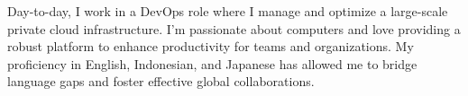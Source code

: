 

\begin{cvparagraph}

Day-to-day, I work in a DevOps role where I manage and optimize a large-scale private cloud infrastructure. I'm passionate about computers and love providing a robust platform to enhance productivity for teams and organizations. My proficiency in English, Indonesian, and Japanese has allowed me to bridge language gaps and foster effective global collaborations.
\end{cvparagraph}
